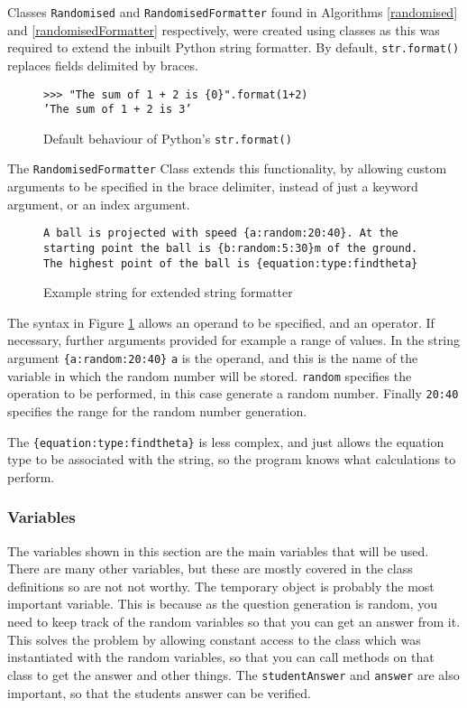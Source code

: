 Classes \texttt{Randomised} and \texttt{RandomisedFormatter} found in Algorithms \ref{randomised} and \ref{randomisedFormatter} respectively, were created using classes as this was required to extend the inbuilt Python string formatter. By default, \texttt{str.format()} replaces fields delimited by braces\autocite{pystr}.
\begin{figure}[H]
	\centering
	\texttt{>>> "The sum of 1 + 2 is \{0\}".format(1+2)}\\
	\texttt{'The sum of 1 + 2 is 3'}
	\caption{Default behaviour of Python's \texttt{str.format()}\autocite{pystr}}
\end{figure}
The \texttt{RandomisedFormatter} Class extends this functionality, by allowing custom arguments to be specified in the brace delimiter, instead of just a keyword argument, or an index argument. 
\begin{figure}[H]
	\label{exformat}
	\centering
	\texttt{A ball is projected with speed \{a:random:20:40\}. At the starting point the ball is \{b:random:5:30\}m of the ground. The highest point of the ball is \{equation:type:findtheta\}}
	\caption{Example string for extended string formatter}
\end{figure}
The syntax in Figure \ref{exformat} allows an operand to be specified, and an operator. If necessary, further arguments provided for example a range of values. In the string argument \texttt{\{a:random:20:40\}} \texttt{a} is the operand, and this is the name of the variable in which the random number will be stored. \texttt{random} specifies the operation to be performed, in this case generate a random number. Finally \texttt{20:40} specifies the range for the random number generation.

The \texttt{\{equation:type:findtheta\}} is less complex, and just allows the equation type to be associated with the string, so the program knows what calculations to perform.

\subsubsection{Variables}
The variables shown in this section are the main variables that will be used. There are many other variables, but these are mostly covered in the class definitions so are not not worthy. The temporary object is probably the most important variable. This is because as the question generation is random, you need to keep track of the random variables so that you can get an answer from it. This solves the problem by allowing constant access to the class which was instantiated with the random variables, so that you can call methods on that class to get the answer and other things. The \texttt{studentAnswer} and \texttt{answer} are also important, so that the students answer can be verified.
